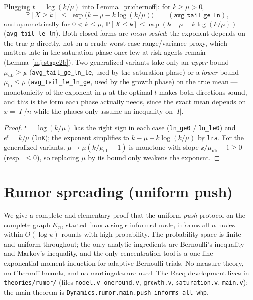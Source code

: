 \begin{lemma}\label{pr:chernofflog}
  \rocqok
  Plugging $t=\log(k/\mu)$ into Lemma~\ref{pr:chernoff}: for $k\ge\mu>0$,
  \[
    \mathbb{P}[X\ge k] \;\le\; \exp\bigl(k-\mu-k\log(k/\mu)\bigr)
    \qquad(\texttt{avg\_tail\_ge\_ln}),
  \]
  and symmetrically for $0<k\le\mu$,
  $\mathbb{P}[X\le k] \le \exp(k-\mu-k\log(k/\mu))$
  (\texttt{avg\_tail\_le\_ln}).
  Both closed forms are \emph{mean-scaled}: the exponent depends on the true
  $\mu$ directly, not on a crude worst-case range/variance proxy, which
  matters late in the saturation phase once few at-risk agents remain
  (Lemma~\ref{mj:stage2b}). Two generalized variants take only an
  \emph{upper} bound $\mu_{\mathrm{ub}}\ge\mu$ (\texttt{avg\_tail\_ge\_ln\_le},
  used by the saturation phase) or a \emph{lower} bound $\mu_{\mathrm{lb}}
  \le\mu$ (\texttt{avg\_tail\_le\_ln\_ge}, used by the growth phase) on the
  true mean --- monotonicity of the exponent in $\mu$ at the optimal $t$
  makes both directions sound, and this is the form each phase actually
  needs, since the exact mean depends on $x=|I|/n$ while the phases only
  assume an inequality on $|I|$.
\end{lemma}
\begin{proof}
  \rocqok
  $t = \log(k/\mu)$ has the right sign in each case (\texttt{ln\_ge0} /
  \texttt{ln\_le0}) and $e^t = k/\mu$ (\texttt{lnK}); the exponent
  simplifies to $k - \mu - k\log(k/\mu)$ by \texttt{lra}. For the
  generalized variants, $\mu \mapsto \mu(k/\mu_{\mathrm{ub}} - 1)$ is
  monotone with slope $k/\mu_{\mathrm{ub}} - 1 \ge 0$ (resp.\ $\le 0$), so
  replacing $\mu$ by its bound only weakens the exponent.
\end{proof}

\chapter{Rumor spreading (uniform push)}\label{rs:chapter}

We give a complete and elementary proof that the uniform \emph{push} protocol
on the complete graph $K_n$, started from a single informed node, informs all
$n$ nodes within $O(\log n)$ rounds with high probability. The probability
space is finite and uniform throughout; the only analytic ingredients are
Bernoulli's inequality and Markov's inequality, and the only concentration
tool is a one-line exponential-moment induction for adaptive Bernoulli
trials. No measure theory, no Chernoff bounds, and no martingales are used.
The Rocq development lives in \texttt{theories/rumor/} (files
\texttt{model.v}, \texttt{oneround.v}, \texttt{growth.v},
\texttt{saturation.v}, \texttt{main.v}); the main theorem is
\texttt{Dynamics.rumor.main.push\_informs\_all\_whp}.

